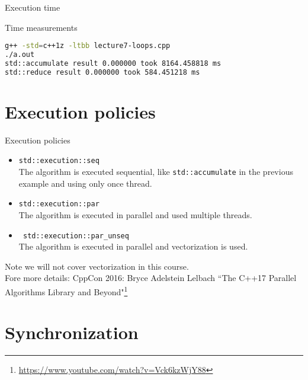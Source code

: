 \documentclass[12pt,t]{beamer}
\begin{document}
\begin{frame}[fragile]{Execution time}

\begin{block}{Time measurements}
\begin{lstlisting}[language=bash]
g++ -std=c++1z -ltbb lecture7-loops.cpp 
./a.out
std::accumulate result 0.000000 took 8164.458818 ms
std::reduce result 0.000000 took 584.451218 ms
\end{lstlisting}


\end{block}


\end{frame}

\section{Execution policies}


\begin{frame}{Execution policies}

\begin{itemize}
\item \lstinline|std::execution::seq| \\
The algorithm is executed sequential, like \lstinline|std::accumulate| in the previous example and using only once thread.
\item \lstinline|std::execution::par| \\
The algorithm is executed in parallel and used multiple threads.
\item \lstinline| std::execution::par_unseq| \\
The algorithm is executed in parallel and vectorization is used.
\end{itemize}
Note we will not cover vectorization in this course. \\
\vspace{0.5cm}
Fore more details: CppCon 2016: Bryce Adelstein Lelbach “The C++17 Parallel Algorithms Library and Beyond"\footnote{\tiny{\url{https://www.youtube.com/watch?v=Vck6kzWjY88}}}
\end{frame}


\section{Synchronization}
\end{document}
